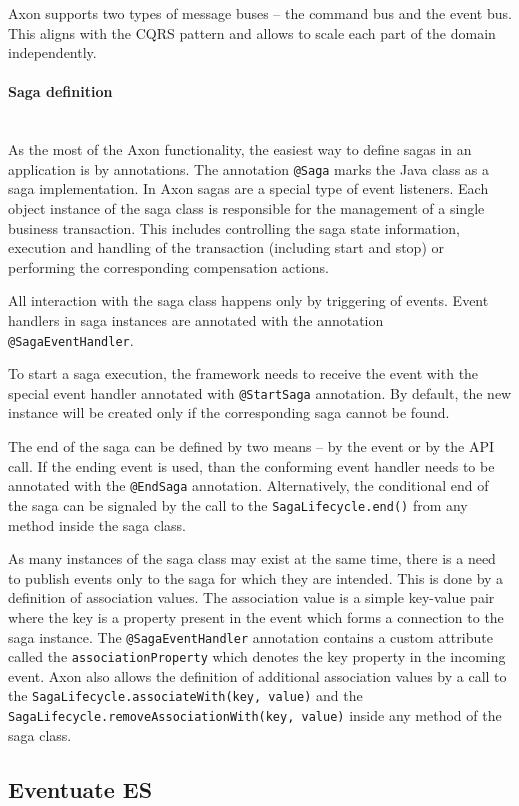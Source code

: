 \documentclass[oneside,
  digital, %
  table,   %
  lof,     %
  lot,     %
]{fithesis3}
\newcommand{\newlinepar}[1]{\paragraph{#1}\needspace{4\baselineskip}\mbox{}\\}
\begin{document}
Axon supports two types of message buses -- the command bus and the event bus. This aligns with the CQRS pattern and allows to scale each part of the domain independently.

\newlinepar{Saga definition}

As the most of the Axon functionality, the easiest way to define sagas in an application is by annotations. The annotation \texttt{@Saga} marks the Java class as a saga implementation. In Axon sagas are a special type of event listeners. Each object instance of the saga class is responsible for the management of a single business transaction. This includes controlling the saga state information, execution and handling of the transaction (including start and stop) or performing the corresponding compensation actions.

All interaction with the saga class happens only by triggering of events. Event handlers in saga instances are annotated with the annotation \texttt{@SagaEventHandler}. 

To start a saga execution, the framework needs to receive the event with the special event handler annotated with \texttt{@StartSaga} annotation. By default, the new instance will be created only if the corresponding saga cannot be found.

The end of the saga can be defined by two means -- by the event or by the API call. If the ending event is used, than the conforming event handler needs to be annotated with the \texttt{@EndSaga} annotation. Alternatively, the conditional end of the saga can be signaled by the call to the \texttt{SagaLifecycle.end()} from any method inside the saga class.

As many instances of the saga class may exist at the same time, there is a need to publish events only to the saga for which they are intended. This is done by a definition of association values. The association value is a simple key-value pair where the key is a property present in the event which forms a connection to the saga instance. The \texttt{@SagaEventHandler} annotation contains a custom attribute called the \texttt{associationProperty} which denotes the key property in the incoming event. Axon also allows the definition of additional association values by a call to the \texttt{SagaLifecycle.associateWith(key, value)} and the \texttt{SagaLifecycle.removeAssociationWith(key, value)} inside any method of the saga class.

\subsection{Eventuate ES}
\end{document}
